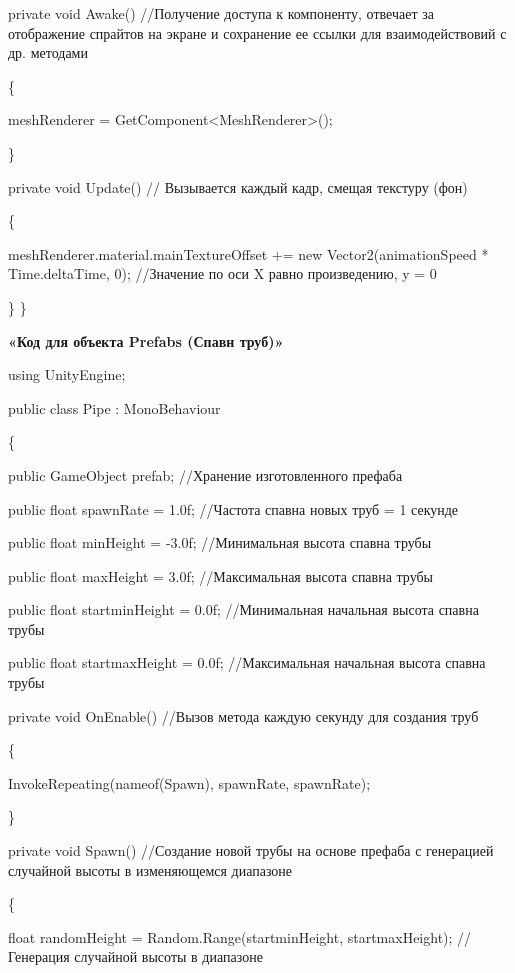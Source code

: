 \documentclass[14pt, oneside]{altsu-report}
\begin{document}
    private void Awake() //Получение доступа к компоненту, отвечает за отображение спрайтов на экране и сохранение ее ссылки для взаимодействовий с др. методами

    \{
    
        meshRenderer = GetComponent<MeshRenderer>();
        
    \}

    private void Update() // Вызывается каждый кадр, смещая текстуру (фон) 

    \{
        
        meshRenderer.material.mainTextureOffset += new Vector2(animationSpeed * Time.deltaTime, 0); //Значение по оси X равно произведению, y =  0
        
    \}
\}

\begin{center}
\label{code:appendix}\textbf{«Код для объекта Prefabs (Спавн труб)»} 
\end{center}

using UnityEngine;

public class Pipe : MonoBehaviour

\{

    public GameObject prefab; //Хранение изготовленного префаба

    public float spawnRate = 1.0f; //Частота спавна новых труб = 1 секунде

    public float minHeight = -3.0f; //Минимальная высота спавна трубы
    
    public float maxHeight = 3.0f; //Максимальная высота спавна трубы

    public float startminHeight = 0.0f; //Минимальная начальная высота спавна трубы
    
    public float startmaxHeight = 0.0f; //Максимальная начальная высота спавна трубы

    private void OnEnable() //Вызов метода каждую секунду для создания труб 
    
    \{
        
        InvokeRepeating(nameof(Spawn), spawnRate, spawnRate);
    
    \}

    private void Spawn() //Создание новой трубы на основе префаба с генерацией случайной высоты в изменяющемся диапазоне
    
    \{
    
        float randomHeight = Random.Range(startminHeight, startmaxHeight); // Генерация случайной высоты в диапазоне
\end{document}

